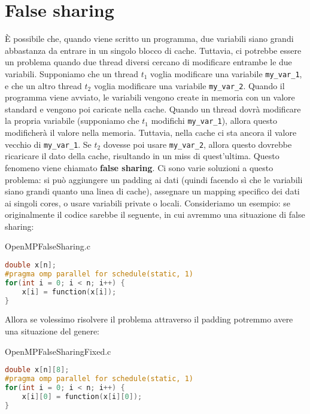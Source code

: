 
\section{False sharing}

È possibile che, quando viene scritto un programma, due variabili siano grandi abbastanza da entrare in un singolo blocco di cache. Tuttavia, ci potrebbe essere un problema quando due thread diversi cercano di modificare entrambe le due variabili.
\nwl
Supponiamo che un thread $t_1$ voglia modificare una variabile \verb|my_var_1|, e che un altro thread $t_2$ voglia modificare una variabile \verb|my_var_2|. Quando il programma viene avviato, le variabili vengono create in memoria con un valore standard e vengono poi caricate nella cache.
\nwl
Quando un thread dovrà modificare la propria variabile (supponiamo che $t_1$ modifichi \verb|my_var_1|), allora questo modificherà il valore nella memoria. Tuttavia, nella cache ci sta ancora il valore vecchio di \verb|my_var_1|. Se $t_2$ dovesse poi usare \verb|my_var_2|, allora questo dovrebbe ricaricare il dato della cache, risultando in un miss di quest'ultima. Questo fenomeno viene chiamato \textbf{false sharing}.
\nwl
Ci sono varie soluzioni a questo problema: si può aggiungere un padding ai dati (quindi facendo sì che le variabili siano grandi quanto una linea di cache), assegnare un mapping specifico dei dati ai singoli cores, o usare variabili private o locali. Consideriamo un esempio: se originalmente il codice sarebbe il seguente, in cui avremmo una situazione di false sharing:

\begin{codeblock}{OpenMPFalseSharing.c}
    \begin{lstlisting}[language = C]
double x[n];
#pragma omp parallel for schedule(static, 1)
for(int i = 0; i < n; i++) {
    x[i] = function(x[i]);
}\end{lstlisting}
\end{codeblock}

Allora se volessimo risolvere il problema attraverso il padding potremmo avere una situazione del genere:

\begin{codeblock}{OpenMPFalseSharingFixed.c}
    \begin{lstlisting}[language = C]
double x[n][8];
#pragma omp parallel for schedule(static, 1)
for(int i = 0; i < n; i++) {
    x[i][0] = function(x[i][0]);
}\end{lstlisting}
\end{codeblock}

